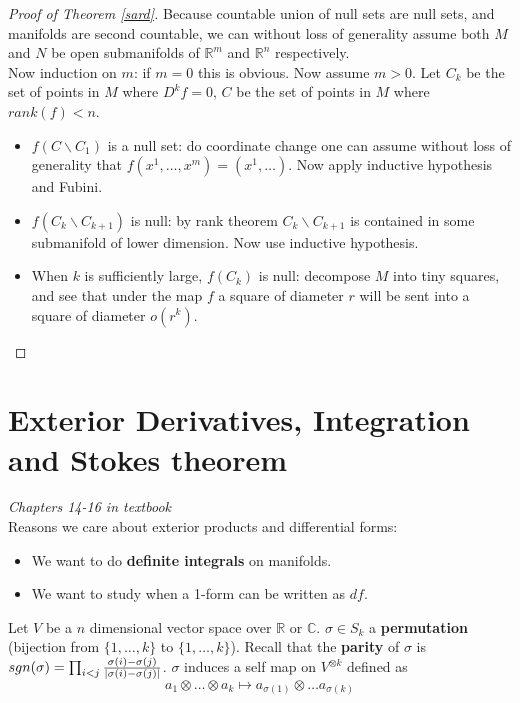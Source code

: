 \documentclass{article}
\theoremstyle{definition}
\begin{document}
\begin{proof}[Proof of Theorem \ref{sard}]
    Because countable union of null sets are null sets, and manifolds are second countable, we can without loss of generality assume both $M$ and $N$ be open submanifolds of $\mathbb{R}^m$ and $\mathbb{R}^n$ respectively.\\

    Now induction on $m$: if $m=0$ this is obvious. Now assume $m>0$. Let $C_k$ be the set of points in $M$ where $D^kf=0$, $C$ be the set of points in $M$ where $rank(f)<n$.

    \begin{itemize}
        \item $f(C\backslash C_1)$ is a null set:  do coordinate change one can assume without loss of generality that $f(x^1, \dots, x^m)=(x^1, \dots)$. Now apply inductive hypothesis and Fubini. 
        \item $f(C_k\backslash C_{k+1})$ is null: by rank theorem $C_k\backslash C_{k+1}$ is contained in some submanifold of lower dimension. Now use inductive hypothesis.
        \item When $k$ is sufficiently large, $f(C_k)$ is null: decompose $M$ into tiny squares, and see that under the map $f$ a square of diameter $r$ will be sent into a square of diameter $o(r^k)$.
    \end{itemize}
\end{proof}

\newpage

\section{Exterior Derivatives, Integration and Stokes theorem}

{\em Chapters 14-16 in textbook}\\

Reasons we care about exterior products and differential forms:

\begin{itemize}
    \item We want to do {\bf definite integrals} on manifolds.
    \item We want to study when a 1-form can be written as $df$.
\end{itemize}

Let $V$ be a $n$ dimensional vector space over $\mathbb{R}$ or $\mathbb{C}$. $\sigma\in S_k$ a {\bf permutation} (bijection from $\{1, \dots, k\}$ to $\{1, \dots, k\}$). Recall that the {\bf parity} of $\sigma$ is $sgn(\sigma)=\prod_{i<j}{\sigma(i)-\sigma(j)\over |\sigma(i)-\sigma(j)|}$.  $\sigma$ induces a self map on $V^{\otimes k}$ defined as
\[a_1\otimes \dots \otimes a_k\mapsto a_{\sigma(1)}\otimes \dots a_{\sigma(k)}\]
\end{document}
